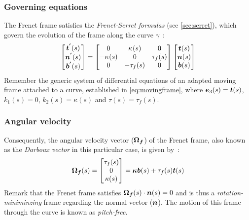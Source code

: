 \subsubsection{Governing equations}\label{sec:serretfrenet}
The Frenet frame satisfies the \emph{Frenet-Serret formulas} (see \cref{sec:serret}), which govern the evolution of the frame along the curve $\gamma$~:
\begin{equation}
	\begin{bmatrix}
		\boldsymbol{t^{'}}(s) \\
		\boldsymbol{n^{'}}(s) \\
		\boldsymbol{b^{'}}(s)
	\end{bmatrix}
	=
	\begin{bmatrix}
		0 & \kappa_{}(s) & 0 \\
		-\kappa_{}(s) & 0 & \tau_f(s) \\
		0 & -\tau_f(s) & 0
	\end{bmatrix}
	\begin{bmatrix}
		\boldsymbol{t}(s) \\
		\boldsymbol{n}(s) \\
		\boldsymbol{b}(s)
	\end{bmatrix}
\label{eq:frenetframegoverning}
\end{equation}
Remember the generic system of differential equations of an adapted moving frame attached to a curve, established in \cref{eq:movingframe}, where $\boldsymbol{e}_{3}(s) = \boldsymbol{t}(s)$, $k_{1}(s) = 0$, $k_{2}(s) = \kappa(s)$ and $\tau(s)= \tau_{f}(s)$.

\subsubsection{Angular velocity}
Consequently, the angular velocity vector ($\boldsymbol{\Omega_{f}}$) of the Frenet frame, also known as the \emph{Darboux vector} in this particular case, is given by~:
\begin{equation}
	\boldsymbol{\Omega_f}(s)
	=
	\begin{bmatrix}
		\tau_{f}(s) \\
		0 \\
		\kappa(s)
	\end{bmatrix}
	= \boldsymbol{\kappa b}(s) +\tau_{f}(s) \boldsymbol{t}(s)
\end{equation}
Remark that the Frenet frame satisfies $\boldsymbol{\Omega_f}(s) \cdot \boldsymbol{n}(s) = 0$ and is thus a \emph{rotation-miniminzing} frame regarding the normal vector ($\boldsymbol{n}$). The motion of this frame through the curve is known as \emph{pitch-free}.

